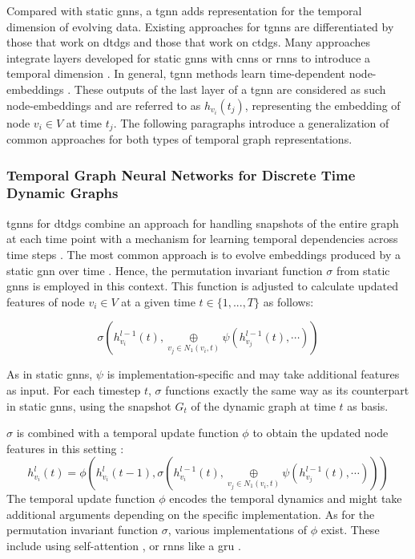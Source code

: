 Compared with static \glspl{gnn}, a \gls{tgnn} adds representation for the temporal dimension of evolving data. Existing approaches for \glspl{tgnn} are differentiated by those that work on \glspl{dtdg} and those that work on \glspl{ctdg}. Many approaches integrate layers developed for static \glspl{gnn} with \glspl{cnn} or \glspl{rnn} to introduce a temporal dimension \cite{wu_comprehensive_2021}. In general, \gls{tgnn} methods learn time-dependent node-embeddings \cite{longa_graph_2023}. These outputs of the last layer of a \gls{tgnn} are considered as such node-embeddings and are referred to as $h_{v_i}(t_j)$, representing the embedding of node $v_i \in V$ at time $t_j$. The following paragraphs introduce a generalization of common approaches for both types of temporal graph representations.

\subsubsection{Temporal Graph Neural Networks for Discrete Time Dynamic Graphs}
\label{s_tgnns_for_dtdgs}
\glspl{tgnn} for \glspl{dtdg} combine an approach for handling snapshots of the entire graph at each time point with a mechanism for learning temporal dependencies across time steps \cite{longa_graph_2023}. The most common approach is to evolve embeddings produced by a static \gls{gnn} over time \cite{longa_graph_2023}. Hence, the permutation invariant function $\sigma$ from static \glspl{gnn} is employed in this context. This function is adjusted to calculate updated features of node $v_i \in V$ at a given time $t \in \{1,...,T\}$ as follows:

\begin{equation}
    \sigma(h_{v_i}^{l-1}(t), \underset{v_j \in N_1(v_i, t)}{\oplus} \psi(h_{v_j}^{l-1}(t), \cdots))
\end{equation}

As in static \glspl{gnn}, $\psi$ is implementation-specific and may take additional features as input. For each timestep $t$, $\sigma$ functions exactly the same way as its counterpart in static \glspl{gnn}, using the snapshot $G_t$ of the dynamic graph at time $t$ as basis.

$\sigma$ is combined with a temporal update function $\phi$ to obtain the updated node features in this setting \cite{you_roland_2022}:
\begin{equation}
    h_{v_i}^l(t) = \phi(h_{v_i}^{l}(t-1), \sigma(h_{v_i}^{l-1}(t), \underset{v_j \in N_1(v_i, t)}{\oplus} \psi(h_{v_j}^{l-1}(t), \cdots)))
\end{equation}
The temporal update function $\phi$ encodes the temporal dynamics \cite{longa_graph_2023} and might take additional arguments depending on the specific implementation. As for the permutation invariant function $\sigma$, various implementations of $\phi$ exist. These include using self-attention \cite{sankar_dysat_2020}, or \glspl{rnn} like a \gls{gru} \cite{you_roland_2022}.

